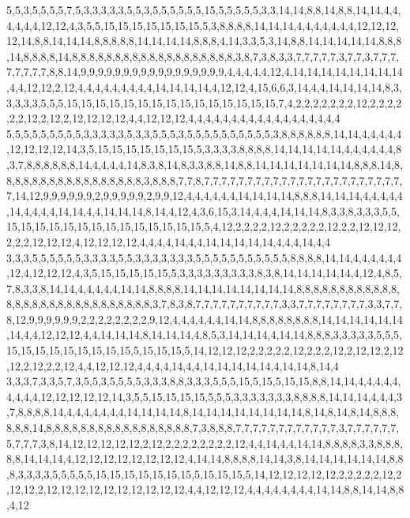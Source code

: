 5,5,3,5,5,5,5,7,5,3,3,3,3,3,5,5,3,5,5,5,5,5,5,15,5,5,5,5,5,3,3,14,14,8,8,14,8,8,14,14,4,4,4,4,4,4,12,12,4,3,5,5,15,15,15,15,15,15,15,5,3,8,8,8,8,14,14,14,4,4,4,4,4,4,4,12,12,12,12,14,8,8,14,14,14,8,8,8,8,8,14,14,14,14,8,8,8,4,14,3,3,5,3,14,8,8,14,14,14,14,14,8,8,8,14,8,8,8,8,14,8,8,8,8,8,8,8,8,8,8,8,8,8,8,8,8,8,8,8,3,8,7,3,8,3,3,7,7,7,7,7,3,7,7,3,7,7,7,7,7,7,7,7,8,8,14,9,9,9,9,9,9,9,9,9,9,9,9,9,9,9,9,9,4,4,4,4,4,12,4,14,14,14,14,14,14,14,14,4,4,12,12,2,12,4,4,4,4,4,4,4,4,4,14,14,14,14,4,12,12,4,15,6,6,3,14,4,4,14,14,14,14,8,3,3,3,3,3,5,5,5,15,15,15,15,15,15,15,15,15,15,15,15,15,15,15,7,4,2,2,2,2,2,2,2,12,2,2,2,2,2,2,12,2,12,2,12,12,12,12,4,4,12,12,12,4,4,4,4,4,4,4,4,4,4,4,4,4,4,4,4,4,4
5,5,5,5,5,5,5,5,5,3,3,3,3,3,5,3,3,5,5,5,3,5,5,5,5,5,5,5,5,5,5,3,8,8,8,8,8,8,14,14,4,4,4,4,4,12,12,12,12,14,3,5,15,15,15,15,15,15,15,5,3,3,3,3,8,8,8,8,14,14,14,14,14,4,4,4,4,4,4,8,3,7,8,8,8,8,8,8,14,4,4,4,4,14,8,3,8,14,8,3,3,8,8,14,8,8,14,14,14,14,14,14,14,8,8,8,14,8,8,8,8,8,8,8,8,8,8,8,8,8,8,8,8,8,3,8,8,8,7,7,8,7,7,7,7,7,7,7,7,7,7,7,7,7,7,7,7,7,7,7,7,7,7,7,7,14,12,9,9,9,9,9,9,2,9,9,9,9,9,2,9,9,12,4,4,4,4,4,4,14,14,14,14,8,8,8,14,14,14,4,4,4,4,4,14,4,4,4,4,14,14,4,4,14,14,14,8,14,4,12,4,3,6,15,3,14,4,4,4,14,14,14,8,3,3,8,3,3,3,5,5,15,15,15,15,15,15,15,15,15,15,15,15,15,15,5,4,12,2,2,2,2,12,2,2,2,2,2,12,2,2,12,12,12,2,2,2,12,12,12,4,12,12,12,12,4,4,4,4,14,4,4,14,14,14,14,14,4,4,4,14,4,4
3,3,3,5,5,5,5,5,5,3,3,3,3,5,5,3,3,3,3,3,3,3,5,5,5,5,5,5,5,5,5,5,5,8,8,8,8,14,14,4,4,4,4,4,4,12,4,12,12,12,4,3,5,15,15,15,15,15,5,3,3,3,3,3,3,3,3,3,8,3,8,14,14,14,14,14,4,12,4,8,5,7,8,3,3,8,14,14,4,4,4,4,4,14,14,8,8,8,8,14,14,14,14,14,14,14,14,8,8,8,8,8,8,8,8,8,8,8,8,8,8,8,8,8,8,8,8,8,8,8,8,8,8,8,8,8,3,7,8,3,8,7,7,7,7,7,7,7,7,7,7,3,3,7,7,7,7,7,7,7,7,3,3,7,7,8,12,9,9,9,9,9,9,2,2,2,2,2,2,2,2,9,12,4,4,4,4,4,4,14,14,8,8,8,8,8,8,8,8,14,14,14,14,14,14,14,4,4,12,12,12,4,4,14,14,14,8,14,14,14,4,8,5,3,14,14,14,4,14,14,8,8,8,3,3,3,3,3,5,5,5,15,15,15,15,15,15,15,15,15,5,15,15,15,5,14,12,12,12,2,2,2,2,2,12,2,2,2,12,2,12,12,2,12,12,2,12,2,2,12,4,4,12,12,12,4,4,4,4,14,4,4,14,14,14,14,14,4,14,14,8,14,4
3,3,3,7,3,3,5,7,3,5,5,3,5,5,5,5,3,3,3,8,8,3,3,3,5,5,5,15,5,15,5,15,15,8,8,14,14,4,4,4,4,4,4,4,4,4,12,12,12,12,12,14,3,5,5,15,15,15,15,5,5,5,3,3,3,3,3,3,3,8,8,8,8,14,14,14,4,4,4,3,7,8,8,8,8,14,4,4,4,4,4,4,4,14,14,14,14,8,14,14,14,14,14,14,14,14,8,14,8,14,8,14,8,8,8,8,8,8,14,8,8,8,8,8,8,8,8,8,8,8,8,8,8,8,8,8,7,3,8,8,8,7,7,7,7,7,7,7,7,7,7,7,7,3,7,7,7,7,7,7,5,7,7,7,3,8,14,12,12,12,12,12,2,12,2,2,2,2,2,2,2,2,12,4,4,14,4,4,14,14,8,8,8,8,3,3,8,8,8,8,8,14,14,14,4,12,12,12,12,12,12,12,12,4,14,14,8,8,8,8,14,14,3,8,14,14,14,14,14,14,8,8,8,3,3,3,3,5,5,5,5,5,15,15,15,15,15,15,15,5,15,15,15,5,14,12,12,12,12,12,2,2,2,2,2,12,2,12,12,2,12,12,12,12,12,12,12,12,12,12,4,4,12,12,12,4,4,4,4,4,4,4,4,14,14,8,8,14,14,8,8,4,12

